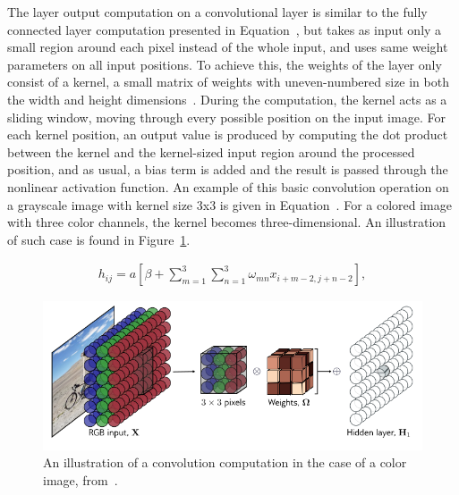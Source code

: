 \documentclass[english,twoside,openright]{UH_DS_MSc}
\begin{document}
The layer output computation on a convolutional layer is similar to the fully connected layer computation
presented in Equation~\cite{eq:fc_layer}, but takes as input only a small region around each pixel instead of 
the whole input, and uses same weight parameters on all input positions. To achieve this, the weights of the 
layer only consist of a kernel, a small 
matrix of weights with uneven-numbered size in both the width and height dimensions~\cite{princebook}. During the computation, the kernel 
acts as a sliding window, moving through every possible position on the input image. For each kernel position, an output 
value is produced by computing the dot product between the kernel and the kernel-sized input region around the processed position, and as usual, a bias term is added and the result is passed through the nonlinear activation function.
An example of this basic convolution operation on a grayscale image with kernel size 3x3 is given in Equation~\cite{eq:convolution}. 
For a colored image with three color channels, the kernel becomes three-dimensional. An illustration 
of such case is found in Figure~\ref{image:3dkernel}.

\begin{align}
    h_{ij} = a \left[ \beta + \sum_{m=1}^{3} \sum_{n=1}^{3} \omega_{mn} x_{i+m-2, j+n-2} \right],
    \label{eq:convolution}
\end{align}

\begin{figure}[h]
    \centering
    \includegraphics*[scale=0.4]{images/3dkernel.png}
    \caption{An illustration of a convolution computation in the case of a color image, from~\cite{princebook}.}
    \label{image:3dkernel}
\end{figure}
\end{document}
